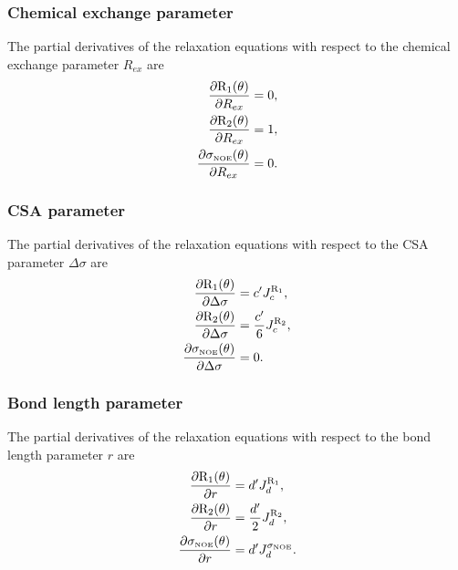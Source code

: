 \subsubsection{Chemical exchange parameter}

The partial derivatives of the relaxation equations with respect to the chemical exchange parameter $R_{ex}$ are
\begin{align}
    \frac{\partial \mathrm{R}_1(\theta)}{\partial R_{ex}} &= 0,          \label{eq: Ri': dR1/dRex} \\
    \frac{\partial \mathrm{R}_2(\theta)}{\partial R_{ex}} &= 1,          \label{eq: Ri': dR2/dRex} \\
    \frac{\partial \sigma_{\scriptscriptstyle \mathrm{NOE}}(\theta)}{\partial R_{ex}} &= 0.   \label{eq: Ri': dsigmaNOE/dRex}
\end{align}


\subsubsection{CSA parameter}

The partial derivatives of the relaxation equations with respect to the CSA parameter $\Delta\sigma$ are
\begin{align}
    \frac{\partial \mathrm{R}_1(\theta)}{\partial \Delta\sigma} &= c' J_c^{\mathrm{R}_1},             \label{eq: Ri': dR1/dCSA} \\
    \frac{\partial \mathrm{R}_2(\theta)}{\partial \Delta\sigma} &= \frac{c'}{6} J_c^{\mathrm{R}_2},   \label{eq: Ri': dR2/dCSA} \\
    \frac{\partial \sigma_{\scriptscriptstyle \mathrm{NOE}}(\theta)}{\partial \Delta\sigma} &= 0.                 \label{eq: Ri': dsigmaNOE/dCSA}
\end{align}


\subsubsection{Bond length parameter}

The partial derivatives of the relaxation equations with respect to the bond length parameter $r$ are
\begin{align}
    \frac{\partial \mathrm{R}_1(\theta)}{\partial r} &= d' J_d^{\mathrm{R}_1},                \label{eq: Ri': dR1/dr} \\
    \frac{\partial \mathrm{R}_2(\theta)}{\partial r} &= \frac{d'}{2} J_d^{\mathrm{R}_2},      \label{eq: Ri': dR2/dr} \\
    \frac{\partial \sigma_{\scriptscriptstyle \mathrm{NOE}}(\theta)}{\partial r} &= d' J_d^{\sigma_{\scriptscriptstyle \mathrm{NOE}}}.  \label{eq: Ri': dsigmaNOE/dr}
\end{align}


